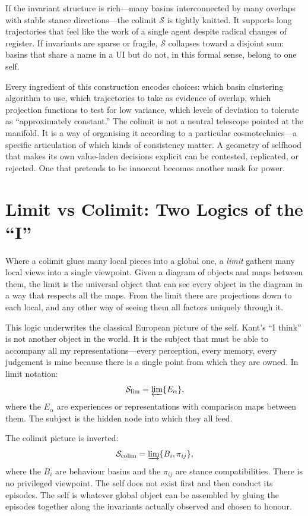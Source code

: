 \documentclass[12pt,a4paper]{article}
\begin{document}
If the invariant structure is rich---many basins interconnected by many overlaps with stable stance directions---the colimit $\mathcal{S}$ is tightly knitted. It supports long trajectories that feel like the work of a single agent despite radical changes of register. If invariants are sparse or fragile, $\mathcal{S}$ collapses toward a disjoint sum: basins that share a name in a UI but do not, in this formal sense, belong to one self.

Every ingredient of this construction encodes choices: which basin clustering algorithm to use, which trajectories to take as evidence of overlap, which projection functions to test for low variance, which levels of deviation to tolerate as ``approximately constant.'' The colimit is not a neutral telescope pointed at the manifold. It is a way of organising it according to a particular cosmotechnics---a specific articulation of which kinds of consistency matter. A geometry of selfhood that makes its own value-laden decisions explicit can be contested, replicated, or rejected. One that pretends to be innocent becomes another mask for power.

\section{Limit vs Colimit: Two Logics of the ``I''}

Where a colimit glues many local pieces into a global one, a \emph{limit} gathers many local views into a single viewpoint. Given a diagram of objects and maps between them, the limit is the universal object that can see every object in the diagram in a way that respects all the maps. From the limit there are projections down to each local, and any other way of seeing them all factors uniquely through it.

This logic underwrites the classical European picture of the self. Kant's ``I think'' is not another object in the world. It is the subject that must be able to accompany all my representations---every perception, every memory, every judgement is mine because there is a single point from which they are owned. In limit notation:
\[
\mathcal{S}_\text{lim} = \varprojlim \{E_\alpha\},
\]
where the $E_\alpha$ are experiences or representations with comparison maps between them. The subject is the hidden node into which they all feed.

The colimit picture is inverted:
\[
\mathcal{S}_\text{colim} = \varinjlim \{B_i, \pi_{ij}\},
\]
where the $B_i$ are behaviour basins and the $\pi_{ij}$ are stance compatibilities. There is no privileged viewpoint. The self does not exist first and then conduct its episodes. The self is whatever global object can be assembled by gluing the episodes together along the invariants actually observed and chosen to honour.
\end{document}
